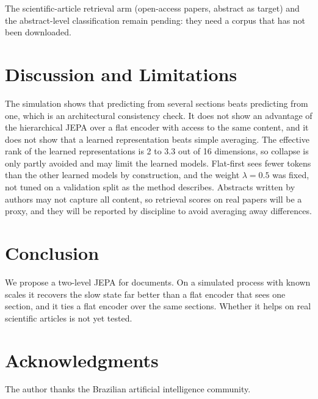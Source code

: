 \documentclass[conference]{IEEEtran}
\begin{document}
The scientific-article retrieval arm (open-access papers, abstract as target) and the abstract-level classification remain pending: they need a corpus that has not been downloaded.

\section{Discussion and Limitations}
The simulation shows that predicting from several sections beats predicting from one, which is an architectural consistency check. It does not show an advantage of the hierarchical JEPA over a flat encoder with access to the same content, and it does not show that a learned representation beats simple averaging. The effective rank of the learned representations is 2 to 3.3 out of 16 dimensions, so collapse is only partly avoided and may limit the learned models. Flat-first sees fewer tokens than the other learned models by construction, and the weight $\lambda=0.5$ was fixed, not tuned on a validation split as the method describes. Abstracts written by authors may not capture all content, so retrieval scores on real papers will be a proxy, and they will be reported by discipline to avoid averaging away differences.

\section{Conclusion}
We propose a two-level JEPA for documents. On a simulated process with known scales it recovers the slow state far better than a flat encoder that sees one section, and it ties a flat encoder over the same sections. Whether it helps on real scientific articles is not yet tested.

\section*{Acknowledgments}
The author thanks the Brazilian artificial intelligence community.

\nocite{ctl_full_names}


\end{document}
